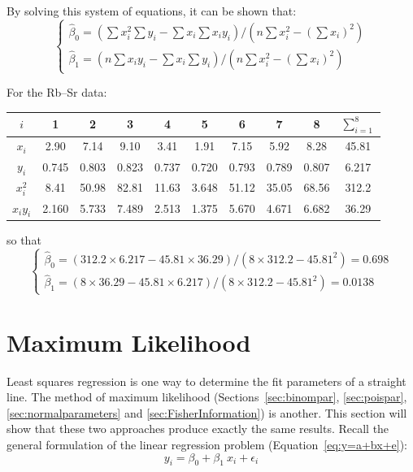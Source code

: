 By solving this system of equations, it can be shown that:
\begin{equation}
\begin{cases}
  \hat{\beta}_0 = \left(\sum x_i^2 \sum y_i - \sum x_i \sum x_iy_i\right) /
  \left(n \sum x_i^2 - \left(\sum x_i\right)^2\right)\\
  \hat{\beta}_1 = \left(n\sum x_iy_i - \sum x_i \sum y_i \right) /
  \left(n \sum x_i^2 - \left(\sum x_i\right)^2\right)
\end{cases}
\label{eq:fitab}
\end{equation}

For the Rb--Sr data:

\begin{center}
  \begin{tabular}{c|cccccccc|c}
    $i$ & 1 & 2 & 3 & 4 & 5 & 6 & 7 & 8 & $\sum_{i=1}^{8}$ \\ \hline
    $x_i$ & 2.90 & 7.14 & 9.10 & 3.41 & 1.91 & 7.15 & 5.92 & 8.28 & 45.81 \\
    $y_i$ & 0.745 & 0.803 & 0.823 & 0.737 & 0.720 &
    0.793 & 0.789 & 0.807 & 6.217\\ \hline
    $x_i^2$ & 8.41 & 50.98 & 82.81 & 11.63 & 3.648 &
    51.12 & 35.05 & 68.56 & 312.2 \\
    $x_iy_i$ & 2.160 & 5.733 & 7.489 & 2.513 & 1.375 &
    5.670 & 4.671 & 6.682 & 36.29
  \end{tabular}
\end{center}

\noindent so that
\begin{equation*}
\begin{cases}
  \hat{\beta}_0 = \left(312.2 \times 6.217 - 45.81 \times 36.29 \right) /
  \left(8 \times 312.2 - 45.81^2\right) = 0.698 \\
  \hat{\beta}_1 = \left( 8 \times 36.29 - 45.81 \times 6.217 \right) /
  \left(8 \times 312.2 - 45.81^2\right) = 0.0138
\end{cases}
\end{equation*}

\section{Maximum Likelihood}
\label{sec:MLregression}

Least squares regression is one way to determine the fit parameters of
a straight line.  The method of maximum likelihood
(Sections~\ref{sec:binompar}, \ref{sec:poispar},
\ref{sec:normalparameters} and \ref{sec:FisherInformation}) is
another. This section will show that these two approaches produce
exactly the same results. Recall the general formulation of the linear
regression problem (Equation~\ref{eq:y=a+bx+e}):
\begin{equation*}
  y_i = \beta_0 + \beta_1~x_i + \epsilon_i
\end{equation*}

